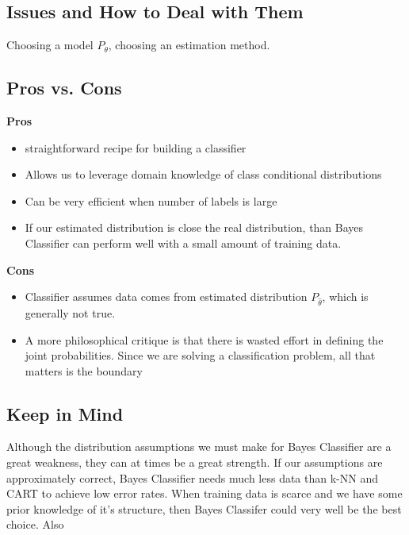 \documentclass[10pt]{article}
\begin{document}
	\subsection*{Issues and How to Deal with Them}
		Choosing a model $P_\theta$, choosing an estimation method. 
	\subsection*{Pros vs. Cons}		
		\textbf{Pros}
		\begin{itemize}
			\item straightforward recipe for building a classifier
			\item Allows us to leverage domain knowledge of class conditional distributions
			\item Can be very efficient when number of labels is large
			\item If our estimated distribution is close the real distribution, than Bayes Classifier
				can perform well with a small amount of training data. 
		\end{itemize}
		\textbf{Cons}
		\begin{itemize}
			\item Classifier assumes data comes from estimated distribution $P_{\hat \theta}$, which 
				is generally not true. 
			\item A more philosophical critique is that there is wasted effort in defining the joint
				probabilities. Since we are solving a classification problem, all that matters 
				is the boundary
		\end{itemize}
	\subsection*{Keep in Mind}
		Although the distribution assumptions we must make for Bayes Classifier are a great
		weakness, they can at times be a great strength. If our assumptions are approximately correct, 
		Bayes Classifier needs much less data than k-NN and CART to achieve low error rates. When
		training data is scarce and we have some prior knowledge of it's structure, then Bayes Classifer
		could very well be the best choice. Also
\end{document}
